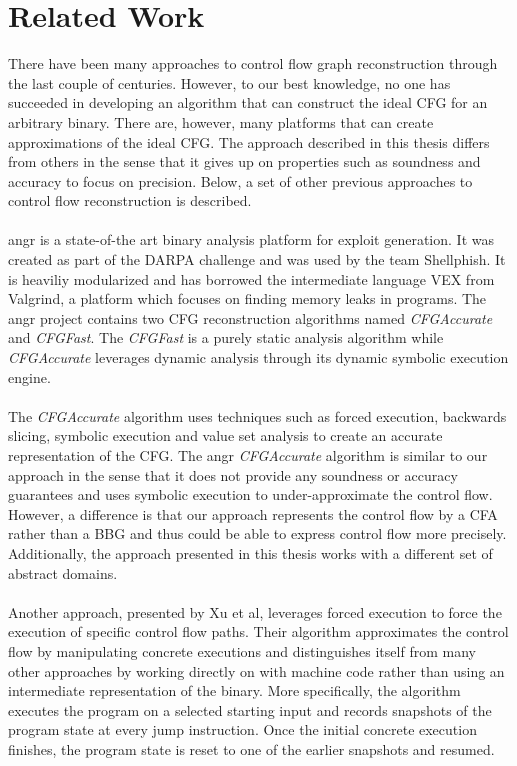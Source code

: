 \documentclass{kththesis}
\newcommand{\fbcomment}[1]{{#1}}
\renewcommand{\fbcomment}[1]{}
\renewcommand{\it}[1]{\textit{#1}}
\begin{document}
\section{Related Work}
\fbcomment{\color{red}Goal:Describe what has and hasn't been done in related work. Also, how the earlier work relates to what has been done in this thesis}
There have been many approaches to control flow graph reconstruction through the last couple of centuries. However, to our best knowledge, no one has succeeded in developing an algorithm that can construct the ideal CFG for an arbitrary binary. There are, however, many platforms that can create approximations of the ideal CFG. The approach described in this thesis differs from others in the sense that it gives up on properties such as soundness and accuracy to focus on precision. Below, a set of other previous approaches to control flow reconstruction is described.
\\ \\
angr\cite{angr} is a state-of-the art binary analysis platform for exploit generation. It was created as part of the DARPA challenge and was used by the team Shellphish. It is heaviliy modularized and has borrowed the intermediate language VEX from Valgrind, a platform which focuses on finding memory leaks in programs. The angr project contains two CFG reconstruction algorithms named \textit{CFGAccurate} and \textit{CFGFast}. The \textit{CFGFast} is a purely static analysis algorithm while \textit{CFGAccurate} leverages dynamic analysis through its dynamic symbolic execution engine. 
\\ \\
The \textit{CFGAccurate} algorithm uses techniques such as forced execution, backwards slicing, symbolic execution and value set analysis to create an accurate representation of the CFG. The angr \it{CFGAccurate} algorithm is similar to our approach in the sense that it does not provide any soundness or accuracy guarantees and uses symbolic execution to under-approximate the control flow. However, a difference is that our approach represents the control flow by a CFA rather than a BBG and thus could be able to express control flow more precisely. Additionally, the approach presented in this thesis works with a different set of abstract domains.
\\ \\
Another approach, presented by Xu et al\cite{preciseCFG}, leverages forced execution to force the execution of specific control flow paths. Their algorithm approximates the control flow by manipulating concrete executions and distinguishes itself from many other approaches by working directly on with machine code rather than using an intermediate representation of the binary. More specifically, the algorithm executes the program on a selected starting input and records snapshots of the program state at every jump instruction. Once the initial concrete execution finishes, the program state is reset to one of the earlier snapshots and resumed. 
\end{document}
